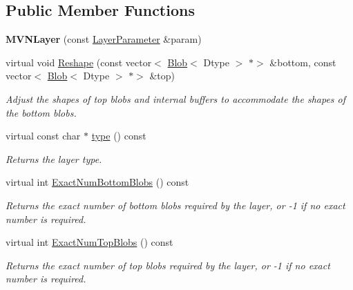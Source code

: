 \subsection*{Public Member Functions}
\begin{DoxyCompactItemize}
\item 
\mbox{\label{classcaffe_1_1_m_v_n_layer_aebec689ed713a68664980b03454e3506}} 
{\bfseries M\+V\+N\+Layer} (const \mbox{\hyperlink{classcaffe_1_1_layer_parameter}{Layer\+Parameter}} \&param)
\item 
virtual void \mbox{\hyperlink{classcaffe_1_1_m_v_n_layer_a48aafabe729bb3b22171cfdbda6e6073}{Reshape}} (const vector$<$ \mbox{\hyperlink{classcaffe_1_1_blob}{Blob}}$<$ Dtype $>$ $\ast$$>$ \&bottom, const vector$<$ \mbox{\hyperlink{classcaffe_1_1_blob}{Blob}}$<$ Dtype $>$ $\ast$$>$ \&top)
\begin{DoxyCompactList}\small\item\em Adjust the shapes of top blobs and internal buffers to accommodate the shapes of the bottom blobs. \end{DoxyCompactList}\item 
\mbox{\label{classcaffe_1_1_m_v_n_layer_af32c09dc68d5a12dd2111ff07b373e8a}} 
virtual const char $\ast$ \mbox{\hyperlink{classcaffe_1_1_m_v_n_layer_af32c09dc68d5a12dd2111ff07b373e8a}{type}} () const
\begin{DoxyCompactList}\small\item\em Returns the layer type. \end{DoxyCompactList}\item 
virtual int \mbox{\hyperlink{classcaffe_1_1_m_v_n_layer_afd9b078a1bb48de9b91f3766edbbf058}{Exact\+Num\+Bottom\+Blobs}} () const
\begin{DoxyCompactList}\small\item\em Returns the exact number of bottom blobs required by the layer, or -\/1 if no exact number is required. \end{DoxyCompactList}\item 
virtual int \mbox{\hyperlink{classcaffe_1_1_m_v_n_layer_ae10d9ef135adf3cd25e86ce06188c814}{Exact\+Num\+Top\+Blobs}} () const
\begin{DoxyCompactList}\small\item\em Returns the exact number of top blobs required by the layer, or -\/1 if no exact number is required. \end{DoxyCompactList}\item 

\end{DoxyCompactItemize}
